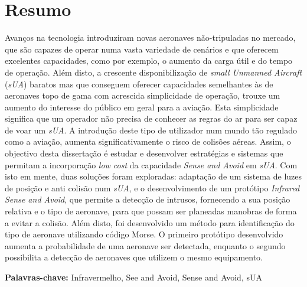 
\section*{Resumo}


Avan\c{c}os na tecnologia introduziram novas aeronaves n\~{a}o-tripuladas no mercado, que s\~{a}o capazes de operar numa vasta variedade de cen\'{a}rios e que oferecem excelentes capacidades, como por exemplo, o aumento da carga \'{u}til e do tempo de opera\c{c}\~{a}o. Al\'{e}m disto, a crescente disponibiliza\c{c}\~{a}o de \textit{small Unmanned Aircraft} (\textit{sUA}) baratos mas que conseguem oferecer capacidades semelhantes \`{a}s de aeronaves topo de gama com acrescida simplicidade de opera\c{c}\~{a}o, trouxe um aumento do interesse do p\'{u}blico em geral para a avia\c{c}\~{a}o. Esta simplicidade significa que um operador n\~{a}o precisa de conhecer as regras do ar para ser capaz de voar um \textit{sUA}. A introdu\c{c}\~{a}o deste tipo de utilizador num mundo t\~{a}o regulado como a avia\c{c}\~{a}o, aumenta significativamente o risco de colis\~{o}es a\'{e}reas. Assim, o objectivo desta disserta\c{c}\~{a}o \'{e} estudar e desenvolver estrat\'{e}gias e sistemas que permitam a incorpora\c{c}\~{a}o \textit{low cost} da capacidade \textit{Sense and Avoid} em \textit{sUA}. Com isto em mente, duas solu\c{c}\~{o}es foram exploradas: adapta\c{c}\~{a}o de um sistema de luzes de posi\c{c}\~{a}o e anti colis\~{a}o num \textit{sUA}, e o desenvolvimento de um prot\'{o}tipo \textit{Infrared Sense and Avoid}, que permite a detec\c{c}\~{a}o de intrusos, fornecendo a sua posi\c{c}\~{a}o relativa e o tipo de aeronave, para que possam ser planeadas manobras de forma a evitar a colis\~{a}o. Al\'{e}m disto, foi desenvolvido um m\'{e}todo para identifica\c{c}\~{a}o do tipo de aeronave utilizando c\'{o}digo Morse. O primeiro prot\'{o}tipo desenvolvido aumenta a probabilidade de uma aeronave ser detectada,  enquanto o segundo possibilita a detec\c{c}\~{a}o de aeronaves que utilizem o mesmo equipamento.

\vfill

\textbf{\Large Palavras-chave:} Infravermelho, See and Avoid, Sense and Avoid, sUA

\cleardoublepage

